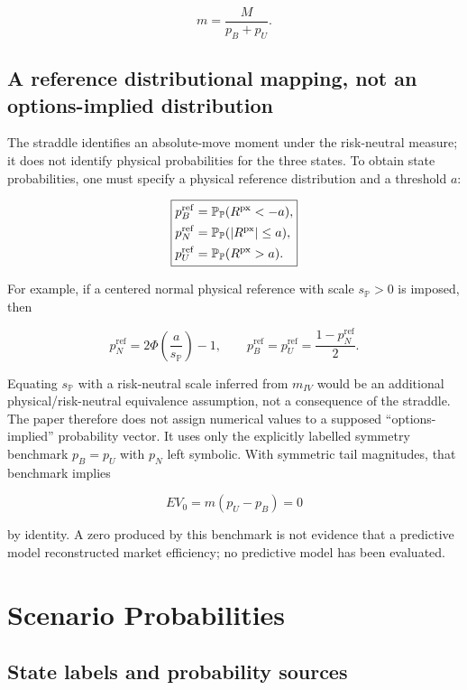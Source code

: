 \[
\boxed{
m=\frac{M}{p_B+p_U}.
}
\]

\subsection{A reference distributional mapping, not an options-implied distribution}

The straddle identifies an absolute-move moment under the risk-neutral measure;
it does not identify physical probabilities for the three states. To obtain
state probabilities, one must specify a physical reference distribution and a
threshold $a$:

\[
\boxed{
\begin{aligned}
p_B^{\mathrm{ref}}&=\mathbb{P}_{\mathbb P}(R^{\mathrm{px}}<-a),\\
p_N^{\mathrm{ref}}&=\mathbb{P}_{\mathbb P}(|R^{\mathrm{px}}|\le a),\\
p_U^{\mathrm{ref}}&=\mathbb{P}_{\mathbb P}(R^{\mathrm{px}}>a).
\end{aligned}}
\]

For example, if a centered normal physical reference with scale
$s_{\mathbb P}>0$ is imposed, then

\[
p_N^{\mathrm{ref}}=2\Phi\left(\frac{a}{s_{\mathbb P}}\right)-1,
\qquad
p_B^{\mathrm{ref}}=p_U^{\mathrm{ref}}
=\frac{1-p_N^{\mathrm{ref}}}{2}.
\]

Equating $s_{\mathbb P}$ with a risk-neutral scale inferred from $m_{IV}$ would
be an additional physical/risk-neutral equivalence assumption, not a consequence
of the straddle. The paper therefore does not assign numerical values to a
supposed ``options-implied'' probability vector. It uses only the explicitly
labelled symmetry benchmark $p_B=p_U$ with $p_N$ left symbolic. With symmetric
tail magnitudes, that benchmark implies

\[
\boxed{
EV_0=m(p_U-p_B)=0
}
\]

by identity. A zero produced by this benchmark is not evidence that a predictive
model reconstructed market efficiency; no predictive model has been evaluated.

\section{Scenario Probabilities}
\label{sec:prob}

\subsection{State labels and probability sources}

